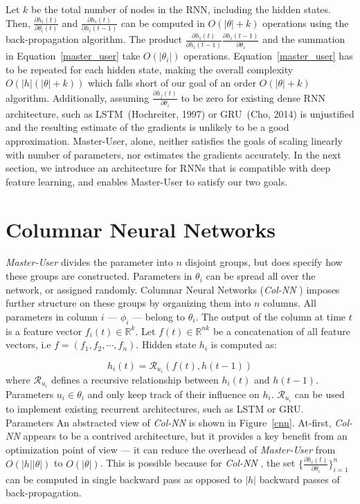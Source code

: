 \documentclass{article}
\newcommand{\algoname}{\textit{Master-User} }
\newcommand{\archi}{\textit{Col-NN} }
\begin{document}
 Let $k$ be the total number of nodes in the RNN, including the hidden states. Then, $\frac{\partial h_i(t)}{\partial \theta_i(t)}$ and $ \frac{\partial h_i(t)}{\partial h_i(t-1)}$ can be computed in $O(|\theta| + k)$ operations using the back-propagation algorithm. The product $\frac{\partial h_i(t)}{\partial h_i(t-1)} \frac{\partial h_i(t-1)}{\partial \theta_i}$ and the summation in Equation~\ref{master_user} take $O(|\theta_i|)$ operations. Equation~\ref{master_user} has to be repeated for each hidden state, making the overall complexity $O(|h|(|\theta| + k))$ which falls short of our goal of an order $O(|\theta| +k)$ algorithm. Additionally, assuming $\frac{\partial h_j(t)}{\partial \theta_i}$ to be zero for existing dense RNN architecture, such as LSTM~(Hochreiter, 1997) or GRU~(Cho, 2014) is unjustified and the resulting estimate of the gradients is unlikely to be a good approximation. Master-User, alone, neither satisfies the goals of scaling linearly with number of parameters, nor estimates the gradients accurately. In the next section, we introduce an architecture for RNNs that is compatible with deep feature learning, and enables Master-User to satisfy our two goals.
 
 \section{Columnar Neural Networks}
 \algoname divides the parameter into $n$ disjoint groups, but does specify how these groups are constructed. Parameters in $\theta_i$ can be spread all over the network, or assigned randomly. Columnar Neural Networks (\archi) imposes further structure on these groups by organizing them into $n$ columns. All parameters in column $i$ --- $\phi_i$ --- belong to $\theta_i$. The output of the column at time $t$ is a feature vector $f_i(t) \in \mathbb R^k$.  Let $f(t) \in \mathbb R^{nk}$ be a concatenation of all feature vectors, i.e $f = (f_1, f_2, \cdots, f_n)$. Hidden state $h_i$ is computed as: 
 
 \begin{equation}
     h_i(t) = \mathcal R_{u_i}(f(t), h(t-1))
 \end{equation}
 where $\mathcal R_{u_i}$ defines a recursive relationship between $h_i(t)$ and $h(t-1)$. Parameters $u_i \in \theta_i$ and only keep track of their influence on $h_i$. $\mathcal R_{u_i}$ can be used to implement existing recurrent architectures, such as LSTM or GRU. Parameters An abstracted view of \archi is shown in Figure~\ref{cnn}. At-first, \archi appears to be a contrived architecture, but it provides a key benefit from an optimization point of view --- it can reduce the overhead of \algoname from $O(|h||\theta|)$ to $O(|\theta|)$. This is possible because for \archi, the set $\{\frac{\partial h_i(t)}{\partial \theta_i}\}_{i=1}^n$ can be computed in single backward pass as opposed to $|h|$ backward passes of back-propagation. 
 
\end{document}
